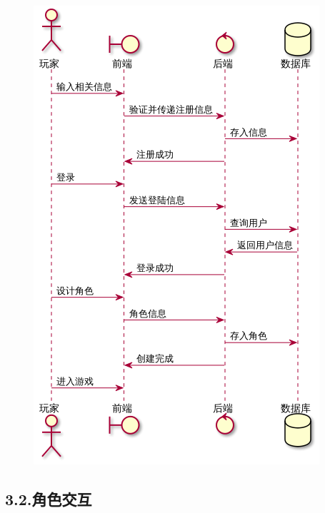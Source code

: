 \documentclass{article}
\begin{document}
\begin{figure}[tbp]%
\begin{mdcenter}%

\noindent{}\includegraphics[keepaspectratio=true,width=\dimwidth{0.70}]{./img/7}{}%

\mdhr{}%

\noindent{}%
\end{mdcenter}%
\end{figure}%

\subsection{3.2.\hspace*{0.5em}角色交互}\label{32}%

\end{document}
